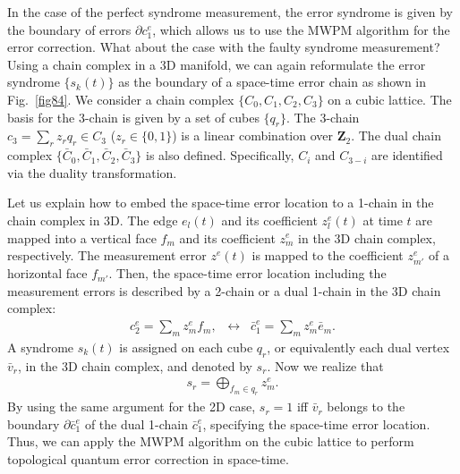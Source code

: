 In the case of the perfect syndrome measurement, the error syndrome is given by the boundary of errors $\partial c_1^e$, which allows us to use the MWPM algorithm for the error correction.
What about the case with the faulty syndrome measurement?
Using a chain complex in a 3D manifold, we can again reformulate the error syndrome $\{ s_k (t) \}$ as the boundary of a space-time error chain as shown in Fig.~\ref{fig84}.
We consider a chain complex $\{ C_0, C_1, C_2, C_3\}$ on a cubic lattice.
The basis for the 3-chain is given by a set of cubes $\{ q_r \}$. 
The 3-chain $c_3 = \sum _r z_r q_r \in C_3$ ($z_r\in \{ 0,1\}$) is a linear combination over $\mathbf{Z}_2$.
The dual chain complex $\{ \bar C_0, \bar C_1 , \bar C_2 , \bar C_3\}$ is also defined.
Specifically, $C_i$ and $C_{3-i}$ are identified via the duality transformation.

Let us explain how to embed the space-time error location to a 1-chain in the chain complex in 3D.
The edge $e_l(t)$ and its coefficient $z_l^e(t)$ at time $t$ are mapped into a vertical face $f_m$ and its coefficient $z_m^e$ in the 3D chain complex,
respectively.
The measurement error $z^e(t)$ is mapped to the coefficient $z_{m'}^e$ of a horizontal face $f_{m'}$.
Then, the space-time error location including the measurement errors is described by a 2-chain or a dual 1-chain in the 3D chain complex:
\begin{eqnarray}
c_2 ^e = \sum _m z_m^e f_m, \;\; \leftrightarrow \;\; \bar c_1 ^e = \sum _m z_m^e \bar e_m.
\end{eqnarray}
A syndrome $s_k (t)$ is assigned on each cube $q_r$, or equivalently each dual vertex $\bar v_ r$, in the 3D chain complex, and denoted by $s_r$.
Now we realize that 
\begin{eqnarray}
s_r = \bigoplus _{f_m \in q_r} z_m^e.
\end{eqnarray}
By using the same argument for the 2D case, $s_r =1$ iff $\bar v_r$ belongs to the boundary $\partial \bar c_1^e$ of the dual 1-chain $\bar c_1^e$, specifying the space-time error location.
Thus, we can apply the MWPM algorithm on the cubic lattice to perform topological quantum error correction in space-time. 

